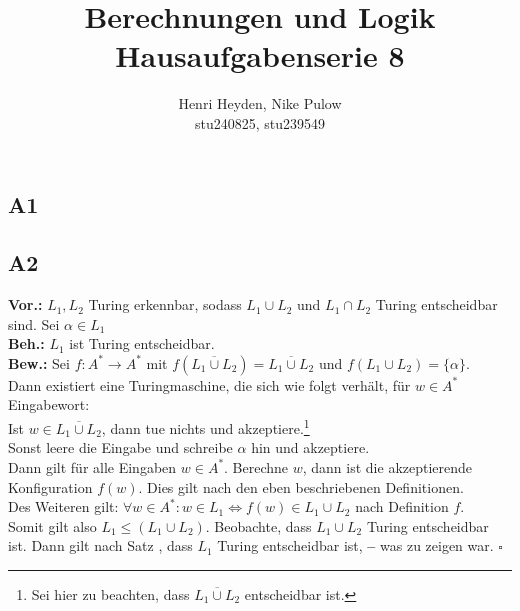 \documentclass[12pt, a4paper]{article}
\title{Berechnungen und Logik\\Hausaufgabenserie 8}
\author{Henri Heyden, Nike Pulow \\ \small stu240825, stu239549}
\date{}
\newcommand*{\qed}{\null\nobreak\hfill\ensuremath{\square}}
\newcommand*{\gedanke}{\textbf{-- }}
\newcommand*{\gap}{\text{ }}
\newcommand*{\vor}{\textbf{Vor.:} \gap}
\newcommand*{\beh}{\textbf{Beh.:} \gap}
\newcommand*{\bew}{\textbf{Bew.:} \gap}
\begin{document}
\maketitle

\onehalfspacing
\vspace*{-2cm}
\subsection*{A1}
\subsection*{A2}
\vor \(L_1, L_2\) Turing erkennbar, sodass \(L_1 \cup L_2\) und \(L_1 \cap L_2\) Turing entscheidbar sind. Sei \(\alpha \in L_1\) \\
\beh \(L_1\) ist Turing entscheidbar. \\
\bew Sei \(f : A^* \rightarrow A^*\) mit \(f(\overline{L_1 \cup L_2}) = \overline{L_1 \cup L_2}\) und \(f(L_1 \cup L_2) = \{\alpha\}\). \\
Dann existiert eine Turingmaschine, die sich wie folgt verhält, für \(w \in A^*\) Eingabewort: \\
Ist \(w \in \overline{L_1 \cup L_2}\), dann tue nichts und akzeptiere.\footnote[1]{Sei hier zu beachten, dass \(\overline{L_1 \cup L_2}\) entscheidbar ist.} \\
Sonst leere die Eingabe und schreibe \(\alpha\) hin und akzeptiere. \\
Dann gilt für alle Eingaben \(w \in A^*\). Berechne \(w\), dann ist die akzeptierende Konfiguration \(f(w)\). Dies gilt nach den eben beschriebenen Definitionen. \\
Des Weiteren gilt: \(\forall w \in A^*: w \in L_1 \Leftrightarrow f(w) \in L_1 \cup L_2\) nach Definition \(f\). \\ Somit gilt also \(L_1 \le (L_1 \cup L_2)\). Beobachte, dass \(L_1 \cup L_2\) Turing entscheidbar ist.
Dann gilt nach Satz , dass \(L_1\) Turing entscheidbar ist, \gedanke was zu zeigen war. \qed
\end{document}
